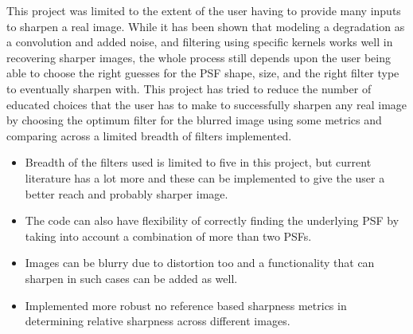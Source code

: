 \noindent This project was limited to the extent of the user having to provide many inputs to sharpen a real image. 
While it has been shown that modeling a degradation as a convolution and added noise, and filtering using specific kernels works well in recovering sharper images, the whole process still depends upon the user being able to choose the right guesses for the PSF shape, size, and the right filter type to eventually sharpen with. This project has tried to reduce the number of educated choices that the user has to make to successfully sharpen any real image by choosing the optimum filter for the blurred image using some metrics and comparing across a limited breadth of filters implemented.
\begin{itemize}
\item Breadth of the filters used is limited to five in this project, but current literature has a lot more and these can be implemented to give the user a better reach and probably sharper image. \\
\item The code can also have flexibility of correctly finding the underlying PSF by taking into account a combination of more than two PSFs. \\
\item Images can be blurry due to distortion too and a functionality that can sharpen in such cases can be added as well.\\
\item Implemented more robust no reference based sharpness metrics in determining relative sharpness across different images.\\
\end{itemize}




\newpage